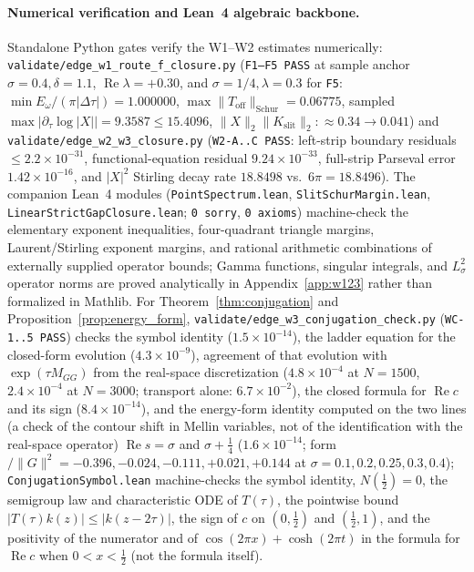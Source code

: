 \documentclass[11pt,a4paper]{article}
\begin{document}
\paragraph{Numerical verification and Lean~4 algebraic backbone.}
Standalone Python gates verify the W1--W2 estimates numerically:
\texttt{validate/edge\_w1\_route\_f\_closure.py} (\texttt{F1--F5 PASS} at sample anchor $\sigma=0.4,\delta=1.1$, $\operatorname{Re}\lambda=+0.30$, and $\sigma=1/4,\lambda=0.3$ for \texttt{F5}:
$\min E_\omega/(\pi|\Delta\tau|)=1.000000$, $\max\|T_{\mathrm{off}}\|_{\mathrm{Schur}}=0.06775$,
sampled $\max|\partial_\tau\log|X||=9.3587\le 15.4096$, $\|X\|_2\|K_{\mathrm{slit}}\|_2:\approx 0.34\to 0.041$)
and \texttt{validate/edge\_w2\_w3\_closure.py} (\texttt{W2-A..C PASS}: left-strip boundary
residuals $\le 2.2\times 10^{-31}$, functional-equation residual $9.24\times 10^{-33}$,
full-strip Parseval error $1.42\times 10^{-16}$, and $|X|^2$ Stirling decay rate $18.8498$ vs.\ $6\pi=18.8496$).
The companion Lean~4 modules (\texttt{PointSpectrum.lean}, \texttt{SlitSchurMargin.lean},
\texttt{LinearStrictGapClosure.lean}; \texttt{0~sorry}, \texttt{0~axioms}) machine-check the
elementary exponent inequalities, four-quadrant triangle margins, Laurent/Stirling exponent margins,
and rational arithmetic combinations of externally supplied operator bounds;
Gamma functions, singular integrals, and $L^2_\sigma$ operator norms are proved analytically in
Appendix~\ref{app:w123} rather than formalized in Mathlib.
For Theorem~\ref{thm:conjugation} and Proposition~\ref{prop:energy_form}, \texttt{validate/edge\_w3\_conjugation\_check.py}
(\texttt{WC-1..5 PASS}) checks the
symbol identity ($1.5\times10^{-14}$), the ladder equation for the closed-form evolution ($4.3\times10^{-9}$),
agreement of that evolution with $\exp(\tau M_{GG})$ from the real-space discretization
($4.8\times10^{-4}$ at $N=1500$, $2.4\times10^{-4}$ at $N=3000$; transport alone: $6.7\times10^{-2}$), the closed formula for
$\operatorname{Re}c$ and its sign ($8.4\times10^{-14}$), and the energy-form identity computed on the two lines (a check of the
contour shift in Mellin variables, not of the identification with the real-space operator)
$\operatorname{Re}s=\sigma$ and $\sigma+\tfrac14$ ($1.6\times10^{-14}$; form$/\|G\|^2=-0.396,-0.024,-0.111,+0.021,+0.144$ at
$\sigma=0.1,0.2,0.25,0.3,0.4$);
\texttt{ConjugationSymbol.lean} machine-checks the symbol identity, $N(\tfrac12)=0$, the semigroup law and
characteristic ODE of $T(\tau)$, the pointwise bound $|T(\tau)k(z)|\le|k(z-2\tau)|$, the sign of $c$ on
$(0,\tfrac12)$ and $(\tfrac12,1)$, and the positivity of the numerator and of $\cos(2\pi x)+\cosh(2\pi t)$ in the formula for
$\operatorname{Re}c$ when $0<x<\tfrac12$ (not the formula itself).
\end{document}
